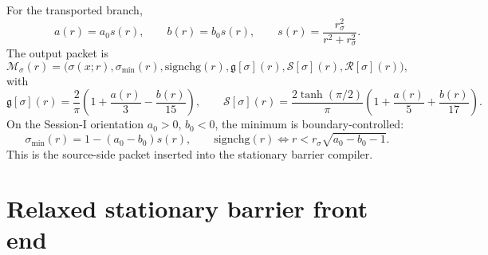 For the transported branch,
\begin{equation}
\label{eq:part08-stage246-transport}
a(r)=a_0s(r),
\qquad
b(r)=b_0s(r),
\qquad
s(r)=\frac{r_\sigma^2}{r^2+r_\sigma^2}.
\end{equation}
The output packet is
\begin{equation}
\label{eq:part08-stage246-msigma-packet}
\mathcal M_\sigma(r)=
\bigl(
\sigma(x;r),
\sigma_{\min}(r),
\mathrm{signchg}(r),
\mathfrak g[\sigma](r),
\mathcal S[\sigma](r),
\mathcal R[\sigma](r)
\bigr),
\end{equation}
with
\begin{equation}
\label{eq:part08-stage246-transported-moments}
\mathfrak g[\sigma](r)
=
\frac{2}{\pi}\left(1+\frac{a(r)}{3}-\frac{b(r)}{15}\right),
\qquad
\mathcal S[\sigma](r)
=
\frac{2\tanh(\pi/2)}{\pi}\left(1+\frac{a(r)}{5}+\frac{b(r)}{17}\right).
\end{equation}
On the Session-I orientation \(a_0>0\), \(b_0<0\), the minimum is boundary-controlled:
\begin{equation}
\label{eq:part08-stage246-session-sign-threshold}
\sigma_{\min}(r)=1-(a_0-b_0)s(r),
\qquad
\mathrm{signchg}(r)\iff r<r_\sigma\sqrt{a_0-b_0-1}.
\end{equation}
This is the source-side packet inserted into the stationary barrier compiler.

\section{Relaxed stationary barrier front end}
\label{sec:part08_relaxed_branch:relaxed-stationary-barrier-front-end}

